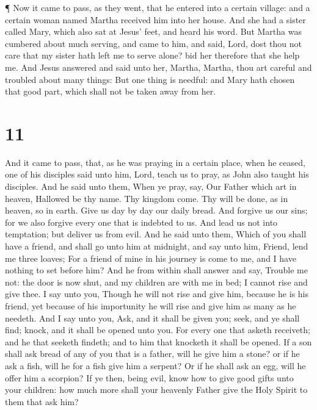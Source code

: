  ¶ Now it came to pass, as they went, that he entered into
a certain village: and a certain woman named Martha received him into
her house.  And she had a sister called Mary, which also
sat at Jesus' feet, and heard his word.  But Martha was
cumbered about much serving, and came to him, and said, Lord, dost thou
not care that my sister hath left me to serve alone? bid her therefore
that she help me.  And Jesus answered and said unto her,
Martha, Martha, thou art careful and troubled about many things:
 But one thing is needful: and Mary hath chosen that good
part, which shall not be taken away from her.

\hypertarget{section-10}{%
\section{11}\label{section-10}}

 And it came to pass, that, as he was praying in a certain
place, when he ceased, one of his disciples said unto him, Lord, teach
us to pray, as John also taught his disciples.  And he said
unto them, When ye pray, say, Our Father which art in heaven, Hallowed
be thy name. Thy kingdom come. Thy will be done, as in heaven, so in
earth.  Give us day by day our daily bread.  And
forgive us our sins; for we also forgive every one that is indebted to
us. And lead us not into temptation; but deliver us from evil.
 And he said unto them, Which of you shall have a friend,
and shall go unto him at midnight, and say unto him, Friend, lend me
three loaves;  For a friend of mine in his journey is come
to me, and I have nothing to set before him?  And he from
within shall answer and say, Trouble me not: the door is now shut, and
my children are with me in bed; I cannot rise and give thee.
 I say unto you, Though he will not rise and give him,
because he is his friend, yet because of his importunity he will rise
and give him as many as he needeth.  And I say unto you,
Ask, and it shall be given you; seek, and ye shall find; knock, and it
shall be opened unto you.  For every one that asketh
receiveth; and he that seeketh findeth; and to him that knocketh it
shall be opened.  If a son shall ask bread of any of you
that is a father, will he give him a stone? or if he ask a fish, will he
for a fish give him a serpent?  Or if he shall ask an egg,
will he offer him a scorpion?  If ye then, being evil, know
how to give good gifts unto your children: how much more shall your
heavenly Father give the Holy Spirit to them that ask him?

